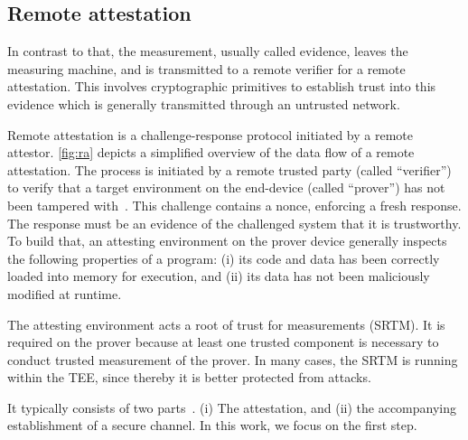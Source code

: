 
\subsection{Remote attestation}




In contrast to that, the measurement, usually called evidence, leaves the measuring machine, and is transmitted to a remote verifier for a remote attestation. This involves cryptographic primitives to establish trust into this evidence which is generally transmitted through an untrusted network.

Remote attestation is a challenge-response protocol initiated by a remote attestor.
\autoref{fig:ra} depicts a simplified overview of the data flow of a remote attestation.
The process is initiated by a remote trusted party (called ``verifier'') to verify that a target environment on the end-device (called ``prover'') has not been tampered with~\cite{Menetrey2022, Coker2011}. This challenge contains a nonce, enforcing a fresh response.
The response must be an evidence of the challenged system that it is trustworthy. To build that, an attesting environment on the prover device generally inspects the following properties of a program: (i) its code and data has been correctly loaded into memory for execution, and (ii) its data has not been maliciously modified at runtime.

The attesting environment acts a root of trust for measurements (SRTM).
It is required on the prover because at least one trusted component is necessary to conduct trusted measurement of the prover. In many cases, the SRTM is running within the TEE, since thereby it is better protected from attacks.

It typically consists of two parts~\cite{McCune2008}.
(i) The attestation, and (ii) the accompanying establishment of a secure channel.
In this work, we focus on the first step.

